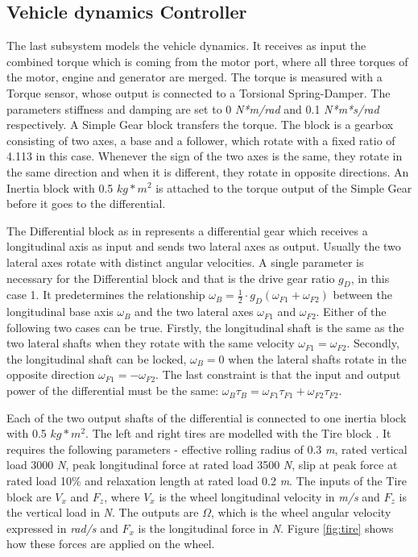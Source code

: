 \subsection{Vehicle dynamics Controller}
The last subsystem models the vehicle dynamics. It receives as input the combined torque which is coming from the motor port, where all three torques of the motor, engine and generator are merged. The torque is measured with a Torque sensor, whose output is connected to a Torsional Spring-Damper. The parameters stiffness and damping are set to 0 \textit{N*m/rad} and 0.1 \textit{N*m*s/rad} respectively. A Simple Gear block \citep{simpleGearMatlab} transfers the torque. The block is a gearbox consisting of two axes, a base and a follower, which rotate with a fixed ratio of 4.113 in this case. Whenever the sign of the two axes is the same, they rotate in the same direction and when it is different, they rotate in opposite directions. An Inertia block with 0.5 $kg*m^2$ is attached to the torque output of the Simple Gear before it goes to the differential. 

The Differential block as in \citet{differentialMatlab} represents a differential gear which receives a longitudinal axis as input and sends two lateral axes as output. Usually the two lateral axes rotate with distinct angular velocities. A single parameter is necessary for the Differential block and that is the  drive gear ratio $g_D$, in this case 1. It predetermines the relationship $\omega_B = \frac{1}{2} \cdot g_D(\omega_{F1} + \omega_{F2})$ between the longitudinal base axis $\omega_B$ and the two lateral axes $\omega_{F1}$ and $\omega_{F2}$. Either of the following two cases can be true. Firstly, the longitudinal shaft is the same as the two lateral shafts when they rotate with the same velocity $\omega_{F1} = \omega_{F2}$. Secondly, the longitudinal shaft can be locked, $\omega_B = 0$ when the lateral shafts rotate in the opposite direction $\omega_{F1} = -\omega_{F2}$. The last constraint is that the input and output power of the differential must be the same: $\omega_B \tau_B = \omega_{F1} \tau_{F1} + \omega_{F2} \tau_{F2}$.

Each of the two output shafts of the differential is connected to one inertia block with 0.5 $kg*m^2$. The left and right tires are modelled with the Tire block \citep{tireMatlab}. It requires the following parameters - effective rolling radius of 0.3 \textit{m}, rated vertical load 3000 \textit{N}, peak longitudinal force at rated load 3500 \textit{N}, slip at peak force at rated load 10\% and relaxation length at rated load 0.2 \textit{m}. The inputs of the Tire block are $V_x$ and $F_z$, where $V_x$ is the wheel longitudinal velocity in \textit{m/s} and $F_z$ is the vertical load in \textit{N}. The outputs are $\Omega$, which is the wheel angular velocity expressed in \textit{rad/s} and $F_x$ is the longitudinal force in \textit{N}. Figure \ref{fig:tire} shows how these forces are applied on the wheel.


